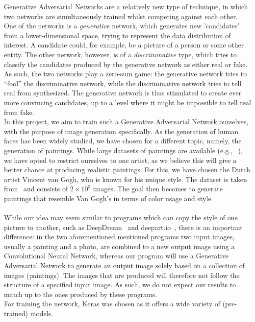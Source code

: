 Generative Adversarial Networks are a relatively new type of technique, in which two networks are simultaneously trained whilst competing against each other. One of the networks is a \textit{generative} network, which generates new 'candidates' from a lower-dimensional space, trying to represent the data distribution of interest. A candidate could, for example, be a picture of a person or some other entity. The other network, however, is of a \textit{discriminative} type, which tries to classify the candidates produced by the generative network as either real or fake. As such, the two networks play a zero-sum game: the generative network tries to ``fool'' the discriminative network, while the discriminative network tries to tell real from synthesized. The generative network is thus stimulated to create ever more convincing candidates, up to a level where it might be impossible to tell real from fake.\\

In this project, we aim to train such a Generative Adversarial Network ourselves, with the purpose of image generation specifically. As the generation of human faces has been widely studied, we have chosen for a different topic, namely, the generation of paintings. While large datasets of paintings are available (e.g., ~\cite{kaggle_rijksmuseum}), we have opted to restrict ourselves to one artist, as we believe this will give a better chance at producing realistic paintings. For this, we have chosen the Dutch artist Vincent van Gogh, who is known for his unique style. The dataset is taken from~\cite{kaggle_van_gogh} and consists of $2 \times 10^3$ images. The goal then becomes to generate paintings that resemble Van Gogh's in terms of color usage and style.\\
\\
While our idea may seem similar to programs which can copy the style of one picture to another, such as DeepDream~\cite{deepdream} and deepart.io~\cite{deepart}, there is an important difference: in the two aforementioned mentioned programs two input images, usually a painting and a photo, are combined to a new output image using a Convolutional Neural Network, whereas our program will use a Generative Adversarial Network to generate an output image solely based on a collection of images (paintings). The images that are produced will therefore not follow the structure of a specified input image. As such, we do not expect our results to match up to the ones produced by these programs.\\


For training the network, Keras was chosen as it offers a wide variety of (pre-trained) models.

